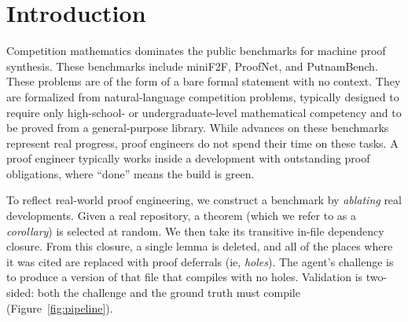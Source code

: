 \documentclass{article}
\begin{document}
\section{Introduction}
\label{sec:intro}

Competition mathematics dominates the public benchmarks for machine proof synthesis. These benchmarks include miniF2F, ProofNet, and PutnamBench. These problems are of the form of a bare formal statement with no context. They are formalized from natural-language competition problems, typically designed to require only high-school- or undergraduate-level mathematical competency and to be proved from a general-purpose library. While advances on these benchmarks represent real progress, proof engineers do not spend their time on these tasks. A proof engineer typically works inside a development with outstanding proof obligations, where “done” means the build is green.

To reflect real-world proof engineering, we construct a benchmark by \emph{ablating} real developments. Given a real repository, a theorem (which we refer to as a \emph{corollary}) is selected at random. We then take its transitive in-file dependency closure. From this closure, a single lemma is deleted, and all of the places where it was cited are replaced with proof deferrals (ie, \emph{holes}). The agent’s challenge is to produce a version of that file that compiles with no holes. Validation is two-sided: both the challenge and the ground truth must compile (Figure~\ref{fig:pipeline}).
\end{document}
